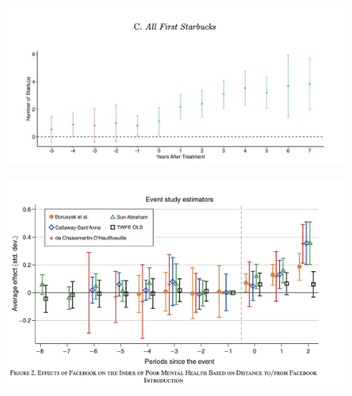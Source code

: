 \documentclass{beamer}
\begin{document}
\begin{frame}

\begin{figure}
    \centering
    \includegraphics[height=0.6\textheight]{./lecture_includes/magic_johnson_eventstudy}
\end{figure}

\end{frame}

\begin{frame}

\begin{figure}
    \centering
    \includegraphics[height=0.6\textheight]{./lecture_includes/facebook_3.png}
\end{figure}

\end{frame}
\end{document}
